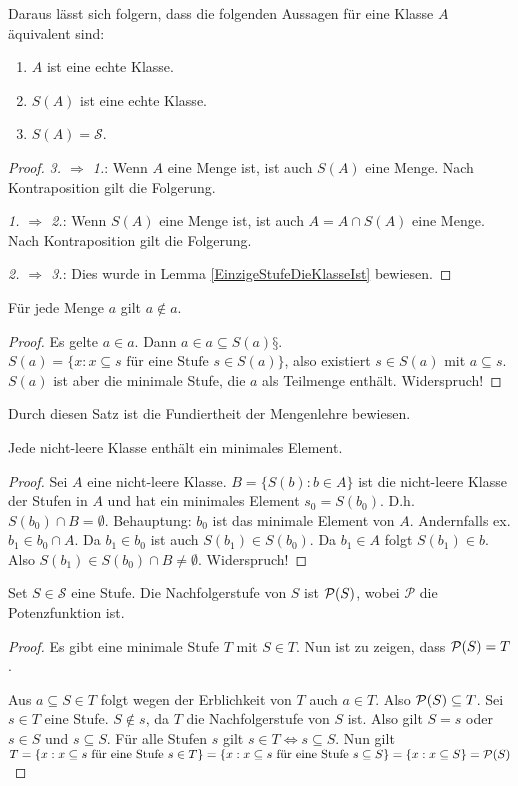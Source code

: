 Daraus lässt sich folgern, dass die folgenden Aussagen für eine Klasse $A$ äquivalent sind:
\begin{enumerate}
	\item $A$ ist eine echte Klasse.
	\item $S(A)$ ist eine echte Klasse.
	\item $S(A)=\mathcal{S}$.
\end{enumerate}
\begin{proof}
	\textit{3. $\Rightarrow$ 1.}: Wenn $A$ eine Menge ist, ist auch $S(A)$ eine Menge. Nach Kontraposition gilt die Folgerung.
	
	\textit{1. $\Rightarrow$ 2.}: Wenn $S(A)$ eine Menge ist, ist auch $A=A\cap S(A)$ eine Menge. Nach Kontraposition gilt die Folgerung.
	
	\textit{2. $\Rightarrow$ 3.}: Dies wurde in Lemma \ref{EinzigeStufeDieKlasseIst} bewiesen.
\end{proof}

\begin{satz}
	Für jede Menge $a$ gilt $a\notin a$.
\end{satz}
\begin{proof}
	Es gelte $a\in a$. Dann $a\in a \subseteq S(a)§$. $S(a)=\{x : x\subseteq s \text{ für eine Stufe } s\in S(a)\}$, also existiert $s\in S(a)$ mit $a\subseteq s$. $S(a)$ ist aber die minimale Stufe, die $a$ als Teilmenge enthält. Widerspruch!
\end{proof}

Durch diesen Satz ist die Fundiertheit der Mengenlehre bewiesen.

\begin{satz}
	Jede nicht-leere Klasse enthält ein minimales Element.
\end{satz}
\begin{proof}
	Sei $A$ eine nicht-leere Klasse. $B=\{S(b) : b \in A\}$ ist die nicht-leere Klasse der Stufen in $A$ und hat ein minimales Element $s_0=S(b_0)$. D.h. $S(b_0)\cap B = \emptyset$. 
	Behauptung: $b_0$ ist das minimale Element von $A$. Andernfalls ex. $b_1\in b_0\cap A$. Da $b_1 \in b_0$ ist auch $S(b_1)\in S(b_0)$. Da $b_1\in A$ folgt $S(b_1)\in b$. Also $S(b_1)\in S(b_0)\cap B \neq \emptyset$. Widerspruch!
\end{proof}

\begin{lemma}
	Set $S\in \mathcal{S}$ eine Stufe. Die Nachfolgerstufe von $S$ ist $\mathcal{P}(S)$, wobei $\mathcal{P}$ die Potenzfunktion ist.
\end{lemma}
\begin{proof}
	Es gibt eine minimale Stufe $T$ mit $S\in T$. Nun ist zu zeigen, dass $\mathcal{P}(S)=T$.
	
	Aus $a\subseteq S\in T$ folgt wegen der Erblichkeit von $T$ auch $a\in T$. Also $\mathcal{P}(S)\subseteq T$. Sei $s \in T$ eine Stufe. $S\notin s$, da $T$ die Nachfolgerstufe von $S$ ist. Also gilt $S=s$ oder $s\in S$ und $s\subseteq S$. Für alle Stufen $s$ gilt $s\in T \Leftrightarrow s\subseteq S$. Nun gilt $T=\{x : x\subseteq s \text{ für eine Stufe } s\in T\}=\{x : x \subseteq s \text{ für eine Stufe } s\subseteq S\}=\{x : x \subseteq S\}=\mathcal{P}(S)$
\end{proof}

